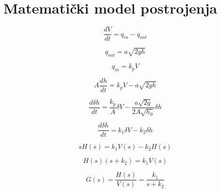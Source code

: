 \newpage
\section{Matematički model postrojenja}

\begin{equation} \frac{dV}{dt} = q_{in} - q_{out} \end{equation}

\begin{equation} q_{out} = a \sqrt{2gh} \end{equation}

\begin{equation} q_{in} = k_p V \end{equation}

\begin{equation} A\frac{dh}{dt} = k_p V - a \sqrt{2gh} \end{equation}

\begin{equation} \frac{d\delta h}{dt} = \frac{k_p}{A} \delta V -
                 \frac{a \sqrt{2g}}{2 A \sqrt{h_0}} \delta h \end{equation}

\begin{equation} \frac{d\delta h}{dt} = k_1 \delta V
                 - k_2 \delta h \end{equation}

\begin{equation} s H(s) = k_1 V(s) - k_2 H(s) \end{equation}

\begin{equation} H(s)(s+k_2) = k_1 V(s) \end{equation}

\begin{equation} G(s) = \frac{H(s)}{V(s)} = \frac{k_1}{s+k_2} \end{equation}

